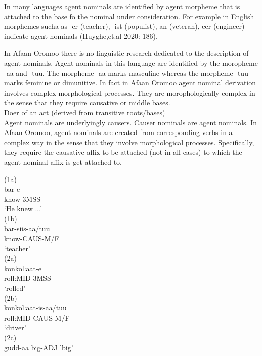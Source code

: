 \documentclass[11pt,a4paper]{article}
\begin{document}
In many languages agent nominals are identified by agent morpheme that is attached to the base fo the nominal under consideration. For example in English morphemes sucha as -er (teacher), -ist (populist), an (veteran), eer (engineer) indicate agent nominals (Huyghe,et.al 2020: 186).

In Afaan Oromoo there is no linguistic research dedicated to the description of agent nominals. Agent nominals in this language are identified by the moropheme -aa and -tuu. The morpheme -aa marks masculine whereas the morpheme -tuu marks feminine or dimunitive. In fact in Afaan Oromoo agent nominal derivation involves complex morphological processes. They are morophologically complex in the sense that they require causative or middle bases. \\

Doer of an act (derived from transitive roots/bases)\\

Agent nominals are underlyingly causers. Causer nominals are agent nominals. In Afaan Oromoo, agent nominals are created from corresponding verbs in a complex way in the sense that they involve morphological processes. Specifically, they require the causative affix to be attached (not in all cases) to which the agent nominal affix is get attached to. 

(1a)\\
\indent	 bar-e\\
\indent know-3MSS\\
\indent	‘He knew ...'\\

(1b) \\
\indent	bar-siis-aa/tuu\\
\indent know-CAUS-M/F\\
\indent ‘teacher’\\

(2a) 	\\
\indent konkol:aat-e\\
\indent roll:MID-3MSS\\
\indent ‘rolled’\\

(2b) \\	
\indent konkol:aat-is-aa/tuu\\
\indent roll:MID-CAUS-M/F\\
\indent ‘driver’\\

(2c) \\
\indent gudd-aa
\indent big-ADJ
\indent 'big'\\
\end{document}

